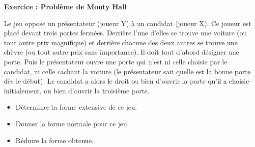 \documentclass[12pt]{article}
\begin{document}
\begin{center}
\textbf{Exercice : Probl\`eme de Monty Hall}
\end{center}
Le jeu oppose un pr\'esentateur (joueur Y) \`a un candidat (joueur X). 
Ce joueur est plac\'e devant trois portes ferm\'ees. 
Derri\`ere l'une d'elles se trouve une voiture (ou tout autre prix magnifique) 
et derri\`ere chacune des deux autres se trouve une ch\`evre (ou tout autre prix sans importance). 
Il doit tout d'abord d\'esigner une porte. 
Puis le pr\'esentateur ouvre une porte qui n'est ni celle choisie par le candidat, ni celle cachant la voiture 
(le pr\'esentateur sait quelle est la bonne porte dès le début). 
Le candidat a alors le droit ou bien d'ouvrir la porte qu'il a choisie initialement, ou bien d'ouvrir la troisi\`eme porte.
                        
\begin{itemize}
 \item D\'eterminer la forme extensive de ce jeu.
 \item Donner la forme normale pour ce jeu.
 \item R\'eduire la forme obtenue. 
\end{itemize}

% 
% 
\end{document}
